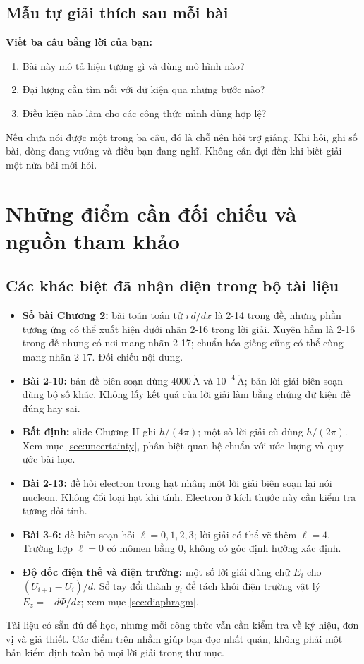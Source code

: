 \documentclass[11pt,a4paper]{article}
\newcommand{\unit}[1]{\,\mathrm{#1}}
\newcommand{\chap}[1]{\par\section{#1}}
\begin{document}
\subsection{Mẫu tự giải thích sau mỗi bài}
\textbf{Viết ba câu bằng lời của bạn:}
\begin{enumerate}
\item Bài này mô tả hiện tượng gì và dùng mô hình nào?
\item Đại lượng cần tìm nối với dữ kiện qua những bước nào?
\item Điều kiện nào làm cho các công thức mình dùng hợp lệ?
\end{enumerate}
Nếu chưa nói được một trong ba câu, đó là chỗ nên hỏi trợ giảng.
Khi hỏi, ghi số bài, dòng đang vướng và điều bạn đang nghĩ.
Không cần đợi đến khi biết giải một nửa bài mới hỏi.

\chap{Những điểm cần đối chiếu và nguồn tham khảo}
\subsection{Các khác biệt đã nhận diện trong bộ tài liệu}
\begin{itemize}
\item \textbf{Số bài Chương 2:} bài toán toán tử $i\,d/dx$ là 2-14 trong đề,
nhưng phần tương ứng có thể xuất hiện dưới nhãn 2-16 trong lời giải.
Xuyên hầm là 2-16 trong đề nhưng có nơi mang nhãn 2-17;
chuẩn hóa giếng cũng có thể cùng mang nhãn 2-17. Đối chiếu nội dung.
\item \textbf{Bài 2-10:} bản đề biên soạn dùng $4000\unit{\mathring A}$ và
$10^{-4}\unit{\mathring A}$; bản lời giải biên soạn dùng bộ số khác.
Không lấy kết quả của lời giải làm bằng chứng dữ kiện đề đúng hay sai.
\item \textbf{Bất định:} slide Chương II ghi $h/(4\pi)$;
một số lời giải cũ dùng $h/(2\pi)$. Xem mục \ref{sec:uncertainty},
phân biệt quan hệ chuẩn với ước lượng và quy ước bài học.
\item \textbf{Bài 2-13:} đề hỏi electron trong hạt nhân; một lời giải
biên soạn lại nói nucleon. Không đổi loại hạt khi tính.
Electron ở kích thước này cần kiểm tra tương đối tính.
\item \textbf{Bài 3-6:} đề biên soạn hỏi $\ell=0,1,2,3$;
lời giải có thể vẽ thêm $\ell=4$. Trường hợp $\ell=0$ có mômen bằng 0,
không có góc định hướng xác định.
\item \textbf{Độ dốc điện thế và điện trường:} một số lời giải dùng chữ
$E_i$ cho $(U_{i+1}-U_i)/d$. Sổ tay đổi thành $g_i$ để tách khỏi
điện trường vật lý $E_z=-d\Phi/dz$; xem mục \ref{sec:diaphragm}.
\end{itemize}
Tài liệu có sẵn đủ để học, nhưng mỗi công thức vẫn cần kiểm tra về ký hiệu,
đơn vị và giả thiết. Các điểm trên nhằm giúp bạn đọc nhất quán, không phải
một bản kiểm định toàn bộ mọi lời giải trong thư mục.
\end{document}
